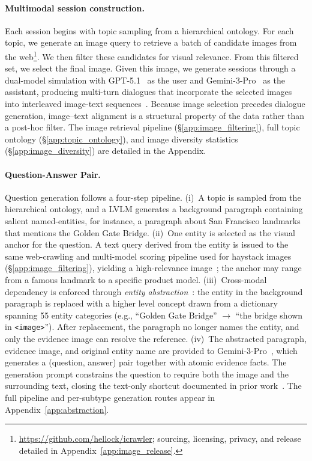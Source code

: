 \documentclass{llmxive}
\begin{document}
\paragraph{Multimodal session construction.}
Each session begins with topic sampling from a hierarchical ontology. For each topic, we generate an image query to retrieve a batch of candidate images from the web\footnote{\url{https://github.com/hellock/icrawler}; sourcing, licensing, privacy, and release detailed in Appendix~\ref{app:image_release}.}. We then filter these candidates for visual relevance. From this filtered set, we select the final image. Given this image, we generate sessions through a dual-model simulation with GPT-5.1~\citep{singh2025openaigpt5card} as the user and Gemini-3-Pro~\citep{googledeepmind2026gemini3procard} as the assistant, producing multi-turn dialogues that incorporate the selected images into interleaved image-text sequences~\cite{laurenccon2023obelics}. Because image selection precedes dialogue generation, image--text alignment is a structural property of the data rather than a post-hoc filter. The image retrieval pipeline (\S\ref{app:image_filtering}), full topic ontology (\S\ref{app:topic_ontology}), and image diversity statistics (\S\ref{app:image_diversity}) are detailed in the Appendix.

\paragraph{Question-Answer Pair.}
Question generation follows a four-step pipeline. (i)~A topic is sampled from the hierarchical ontology, and a LVLM generates a background paragraph containing salient named-entities, for instance, a paragraph about San Francisco landmarks that mentions the Golden Gate Bridge. (ii)~One entity is selected as the visual anchor for the question. A text query derived from the entity is issued to the same web-crawling and multi-model scoring pipeline used for haystack images (\S\ref{app:image_filtering}), yielding a high-relevance image~\cite{hu2023open}; the anchor may range from a famous landmark to a specific product model. (iii)~Cross-modal dependency is enforced through \emph{entity abstraction}~\cite{wang2024abspyramid,wang2024absinstruct,viquae}: the entity in the background paragraph is replaced with a higher level concept drawn from a dictionary spanning 55 entity categories (e.g., ``Golden Gate Bridge'' $\to$ ``the bridge shown in \texttt{<image>}''). After replacement, the paragraph no longer names the entity, and only the evidence image can resolve the reference. (iv)~The abstracted paragraph, evidence image, and original entity name are provided to Gemini-3-Pro~\citep{googledeepmind2026gemini3procard}, which generates a (question, answer) pair together with atomic evidence facts. The generation prompt constrains the question to require both the image and the surrounding text, closing the text-only shortcut documented in prior work~\cite{maharana2024evaluatinglongtermconversationalmemory}. The full pipeline and per-subtype generation routes appear in Appendix~\ref{app:abstraction}.
\end{document}

